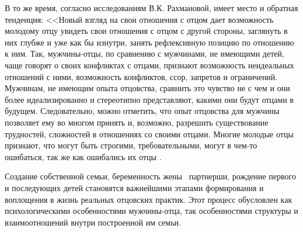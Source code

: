 \documentclass{../../common/thesisbyxetex}
\begin{document}
В то же время, согласно исследованиям В.К. Рахмановой, имеет место и обратная тенденция: <<Новый
взгляд на свои отношения с отцом дает возможность молодому отцу увидеть свои отношения с отцом с
другой стороны, заглянуть в них глубже и уже как бы изнутри, занять рефлексивную позицию по
отношению
к ним. Так, мужчины-отцы, по сравнению с мужчинами, не имеющими детей, чаще говорят о своих
конфликтах с отцами, признают возможность неидеальных отношений с ними, возможность конфликтов,
ссор, запретов и ограничений. Мужчинам, не имеющим опыта отцовства, сравнить это чувство не с чем и
они более идеализированно и стереотипно представляют, какими они будут отцами в будущем.
Следовательно, можно отметить, что опыт отцовства для мужчины позволяет ему во многом принять и,
возможно, разрешить существование трудностей, сложностей в отношениях со своими отцами. Многие
молодые отцы признают, что могут быть строгими, требовательными, могут в чем-то ошибаться, так же
как
ошибались их отцы \cite[54]{relot}.


Создание собственной семьи, беременность жены \ партнерши, рождение первого и последующих детей
становятся важнейшими этапами формирования и воплощения в жизнь реальных отцовских практик. Этот
процесс обусловлен как психологическими особенностями мужчины-отца, так особенностями структуры и
взаимоотношений внутри построенной им семьи.
\end{document}
